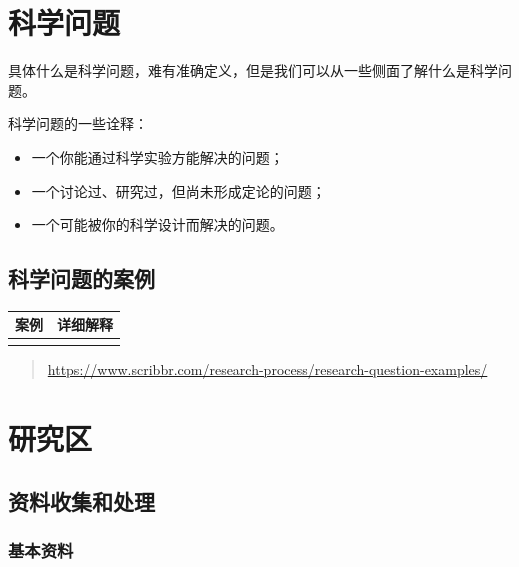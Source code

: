 \documentclass[
]{book}
\providecommand{\tightlist}{%
  \setlength{\itemsep}{0pt}\setlength{\parskip}{0pt}}
\begin{document}
\hypertarget{ux79d1ux5b66ux95eeux9898}{%
\section{科学问题}\label{ux79d1ux5b66ux95eeux9898}}

具体什么是科学问题，难有准确定义，但是我们可以从一些侧面了解什么是科学问题。

科学问题的一些诠释：

\begin{itemize}
\tightlist
\item
  一个你能通过科学实验方能解决的问题；
\item
  一个讨论过、研究过，但尚未形成定论的问题；
\item
  一个可能被你的科学设计而解决的问题。
\end{itemize}

\hypertarget{ux79d1ux5b66ux95eeux9898ux7684ux6848ux4f8b}{%
\subsection{科学问题的案例}\label{ux79d1ux5b66ux95eeux9898ux7684ux6848ux4f8b}}

\begin{longtable}[]{@{}cc@{}}
\toprule()
案例 & 详细解释 \\
\midrule()
\endhead
& \\
\bottomrule()
\end{longtable}

\begin{quote}
\url{https://www.scribbr.com/research-process/research-question-examples/}
\end{quote}

\hypertarget{ux7814ux7a76ux533a}{%
\section{研究区}\label{ux7814ux7a76ux533a}}

\hypertarget{ux8d44ux6599ux6536ux96c6ux548cux5904ux7406}{%
\subsection{资料收集和处理}\label{ux8d44ux6599ux6536ux96c6ux548cux5904ux7406}}

\hypertarget{ux57faux672cux8d44ux6599}{%
\subsubsection{基本资料}\label{ux57faux672cux8d44ux6599}}
\end{document}
